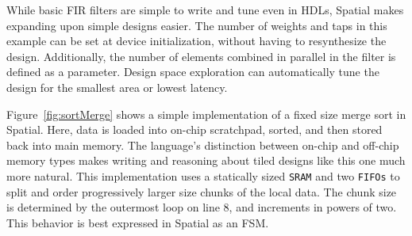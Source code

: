 While basic FIR filters are simple to write and tune even in HDLs, Spatial makes expanding upon simple designs easier. The number of weights and taps in this example can be set at device initialization, without having to resynthesize the design. Additionally, the number of elements combined in parallel in the filter is defined as a parameter. Design space exploration can automatically tune the design for the smallest area or lowest latency.

Figure~\ref{fig:sortMerge} shows a simple implementation of a fixed size merge sort in Spatial. Here, data is loaded into on-chip scratchpad, sorted, and then stored back into main memory.
The language's distinction between on-chip and off-chip memory types makes writing and reasoning about tiled designs like this one much more natural.
This implementation uses a statically sized \texttt{\small{SRAM}} and two \texttt{\small{FIFOs}} to split and order progressively larger size chunks of the local data.
The chunk size is determined by the outermost loop on line 8, and increments in powers of two. This behavior is best expressed in Spatial as an FSM.
